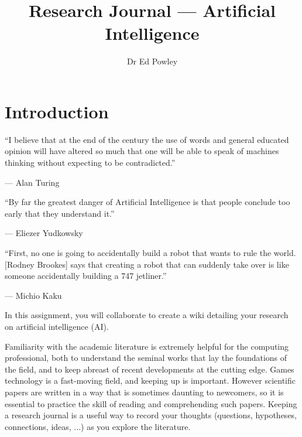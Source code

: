 \documentclass{../../fal_assignment}
\title{Research Journal --- Artificial Intelligence}
\author{Dr Ed Powley}
\begin{document}
\maketitle

\section*{Introduction}

\begin{marginquote}
  ``I believe that at the end of the century the use of words and general educated opinion will have altered so much that one will be able to speak of machines thinking without expecting to be contradicted.''
    
    --- Alan Turing
    
    \marginquoterule
    
    ``By far the greatest danger of Artificial Intelligence is that people conclude too early that they understand it.''
    
    --- Eliezer Yudkowsky
    
    \marginquoterule

        ``First, no one is going to accidentally build a robot that wants to rule the world. [Rodney Brookes] says that creating a robot that can suddenly take over is like someone accidentally building a 747 jetliner.''
    
    --- Michio Kaku
            
\end{marginquote}

In this assignment, you will collaborate to create a wiki detailing your research on artificial intelligence (AI).

Familiarity with the academic literature is extremely helpful for the computing professional,
both to understand the seminal works that lay the foundations of the field,
and to keep abreast of recent developments at the cutting edge.
Games technology is a fast-moving field, and keeping up is important.
However scientific papers are written in a way that is sometimes daunting to newcomers,
so it is essential to practice the skill of reading and comprehending such papers.
Keeping a research journal is a useful way to record your thoughts
(questions, hypotheses, connections, ideas, ...) as you explore the literature.
\end{document}
